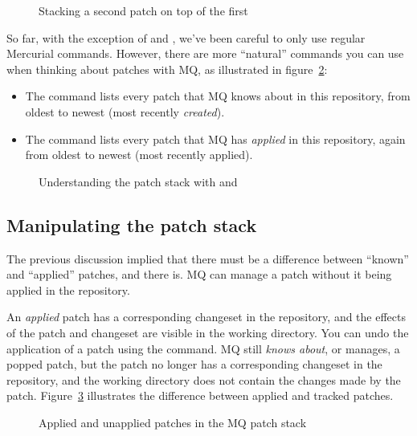 \begin{figure}[ht]
  \caption{Stacking a second patch on top of the first}
  \label{ex:mq:qnew2}
\end{figure}

So far, with the exception of  and , we've
been careful to only use regular Mercurial commands.  However, there
are more ``natural'' commands you can use when thinking about patches
with MQ, as illustrated in figure~\ref{ex:mq:qseries}:

\begin{itemize}
\item The  command lists every patch that MQ knows
  about in this repository, from oldest to newest (most recently
  \emph{created}).
\item The  command lists every patch that MQ has
  \emph{applied} in this repository, again from oldest to newest (most
  recently applied).
\end{itemize}

\begin{figure}[ht]
  \caption{Understanding the patch stack with  and
    }
  \label{ex:mq:qseries}
\end{figure}

\subsection{Manipulating the patch stack}

The previous discussion implied that there must be a difference
between ``known'' and ``applied'' patches, and there is.  MQ can
manage a patch without it being applied in the repository.

An \emph{applied} patch has a corresponding changeset in the
repository, and the effects of the patch and changeset are visible in
the working directory.  You can undo the application of a patch using
the  command.  MQ still \emph{knows about}, or manages, a
popped patch, but the patch no longer has a corresponding changeset in
the repository, and the working directory does not contain the changes
made by the patch.  Figure~\ref{fig:mq:stack} illustrates the
difference between applied and tracked patches.

\begin{figure}[ht]
  \centering
  \caption{Applied and unapplied patches in the MQ patch stack}
  \label{fig:mq:stack}
\end{figure}

